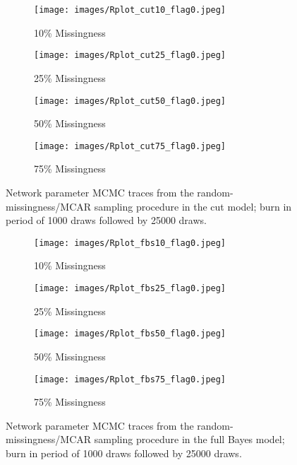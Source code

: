 \documentclass{article}
\begin{document}
\begin{figure}[h]
	\begin{subfigure}[b]{0.5\linewidth}
		\centering
		\texttt{[image: images/Rplot\_cut10\_flag0.jpeg]}
		\caption{10\% Missingness}
		\vspace{4ex}
	\end{subfigure}%
	\begin{subfigure}[b]{0.5\linewidth}
		\centering
		\texttt{[image: images/Rplot\_cut25\_flag0.jpeg]}
		\caption{25\% Missingness}
		\vspace{4ex}
	\end{subfigure}
	\begin{subfigure}[b]{0.5\linewidth}
		\centering
		\texttt{[image: images/Rplot\_cut50\_flag0.jpeg]}
		\caption{50\% Missingness}
	\end{subfigure}
	\begin{subfigure}[b]{0.5\linewidth}
		\centering
		\texttt{[image: images/Rplot\_cut75\_flag0.jpeg]}
		\caption{75\% Missingness}
	\end{subfigure}

	\caption{Network parameter MCMC traces from the random-missingness/MCAR sampling procedure in the cut model; burn in period of 1000 draws followed by 25000 draws.}
	\label{fig:rhoestimatesCUTrandomF0}
\end{figure}

\begin{figure}[h]
	\begin{subfigure}[b]{0.5\linewidth}
		\centering
		\texttt{[image: images/Rplot\_fbs10\_flag0.jpeg]}
		\caption{10\% Missingness}
	\end{subfigure}
	\begin{subfigure}[b]{0.5\linewidth}
		\centering
		\texttt{[image: images/Rplot\_fbs25\_flag0.jpeg]}
		\caption{25\% Missingness}
	\end{subfigure}
	\begin{subfigure}[b]{0.5\linewidth}
		\centering
		\texttt{[image: images/Rplot\_fbs50\_flag0.jpeg]}
		\caption{50\% Missingness}
	\end{subfigure}
	\begin{subfigure}[b]{0.5\linewidth}
		\centering
		\texttt{[image: images/Rplot\_fbs75\_flag0.jpeg]}
		\caption{75\% Missingness}
	\end{subfigure}

	\caption{Network parameter MCMC traces from the random-missingness/MCAR sampling procedure in the full Bayes model; burn in period of 1000 draws followed by 25000 draws.}
	\label{fig:rhoestimatesFBMrandomF0}
\end{figure}
\end{document}
